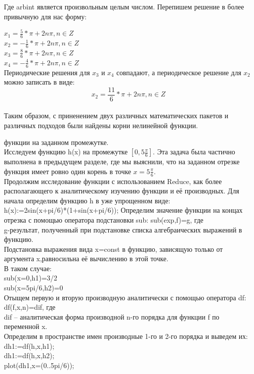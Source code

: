 \documentclass[russian,utf8,nocolumnxxxi,nocolumnxxxii]{eskdtext}
\begin{document}
Где arbint является произвольным целым числом. Перепишем решение в более привычную для нас форму:

$x_1=\frac{5}{6}*\pi+2n\pi,n\in Z$\\
$x_2=-\frac{1}{6}*\pi+2n\pi,n\in Z$\\
$x_3=\frac{8}{6}*\pi+2n\pi,n\in Z$\\
$x_4=-\frac{4}{6}*\pi+2n\pi,n\in Z$\\
Периодические решения для $x_3$ и $x_4$ совпадают, а периодическое решение для $x_2$ можно записать в виде:
$$x_2=\frac{11}{6}*\pi+2n\pi,n\in Z$$\\
Таким образом, с приненением двух различных математических пакетов и различных подходов были найдены корни нелинейной функции.

\newpage
{ функции на заданном промежутке.}\\
Исследуем функцию h(x) на промежутке $[0,5\frac{\pi}{6}]$.
Эта задача была частично выполнена в предыдущем разделе, где мы выяснили, что на заданном отрезке функция имеет ровно один корень в точке $x=5\frac{\pi}{6}$.\\
Продолжим исследование функции с использованием Reduce, как более располагающего к аналитическому изучению функции и её производных. Для начала определим функцию h в уже упрощенном виде:\\
h(x):=2sin(x+pi/6)*(1+sin(x+pi/6));
Определим значение функции на концах отрезка с помощью оператора подстановки sub:
sub(exp,f)=g, где\\
g-результат, полученный при подстановке списка алгебраических выражений в функцию.\\
Подстановка выражения вида x=const в функцию, зависящую только от аргумента x,равносильна её вычислению в этой точке.\\
В таком случае:\\
sub(x=0,h1)=3/2\\
sub(x=5pi/6,h2)=0\\
Отыщем первую и вторую производную аналитически с помощью оператора df:\\
df(f,x,n)=dif, где\\
dif – аналитическая форма производной n-го порядка для функции f по переменной x.\\
Определим в пространстве имен производные 1-го и 2-го порядка и выведем их:\\
dh1:=df(h,x,h1);\\
dh1:=df(h,x,h2);\\
plot(dh1,x=(0..5pi/6));\\
\end{document}
